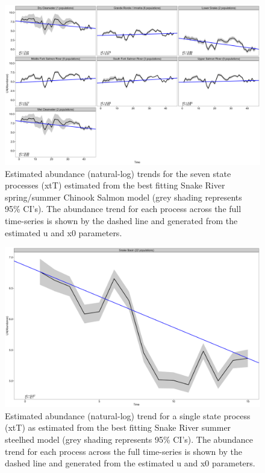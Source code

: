 \documentclass[12pt,a4paper]{article}
\begin{document}
\begin{figure}
\includegraphics[width=1\linewidth]{../figures/Chinook_salmon/Chinook_salmon_states_2024} \caption{Estimated abundance (natural-log) trends for the seven state processes (xtT) estimated from the best fitting Snake River spring/summer Chinook Salmon model (grey shading represents 95\% CI's). The abundance trend for each process across the full time-series is shown by the dashed line and generated from the estimated u and x0 parameters.}\label{fig:chn-state}
\end{figure}

\begin{figure}
\includegraphics[width=1\linewidth]{../figures/Steelhead/Steelhead_states_2024} \caption{Estimated abundance (natural-log) trend for a single state process (xtT) as estimated from the best fitting Snake River summer steelhed model (grey shading represents 95\% CI's). The abundance trend for each process across the full time-series is shown by the dashed line and generated from the estimated u and x0 parameters.}\label{fig:sth-state}
\end{figure}
\end{document}
